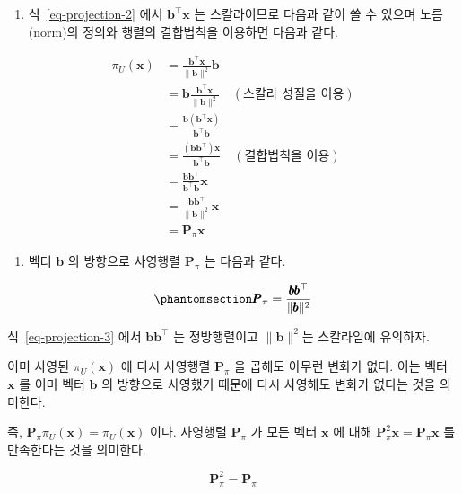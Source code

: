 \documentclass[
  11pt,
  a4paper,
  oneside]{scrbook}
\providecommand{\tightlist}{%
  \setlength{\itemsep}{0pt}\setlength{\parskip}{0pt}}\usepackage{longtable,booktabs,array}
\theoremstyle{definition}
\theoremstyle{definition}
\theoremstyle{plain}
\theoremstyle{remark}
\begin{document}
\begin{enumerate}
\def\labelenumi{\arabic{enumi}.}
\setcounter{enumi}{5}
\tightlist
\item
  식~\ref{eq-projection-2} 에서 \(\pmb{b}^{\top} \pmb{x}\) 는
  스칼라이므로 다음과 같이 쓸 수 있으며 노름(norm)의 정의와 행렬의
  결합법칙을 이용하면 다음과 같다.
\end{enumerate}

\[ 
\begin{aligned}
\pi_U(\pmb{x}) &= \frac{\pmb{b}^{\top} \pmb{x}}{\|\pmb{b}\|^2} \pmb{b} \\
& = \pmb{b} \frac{\pmb{b}^{\top} \pmb{x}}{\|\pmb{b}\|^2} \quad (\text{스칼라 성질을 이용})\\
& =\frac{\pmb{b} (\pmb{b}^{\top} \pmb{x})}{\pmb{b}^{\top} \pmb{b}} \\ 
& =\frac{(\pmb{b} \pmb{b}^{\top}) \pmb{x}}{\pmb{b}^{\top} \pmb{b}}  \quad (\text{결합법칙을 이용})\\
& =\frac{\pmb{b} \pmb{b}^{\top}}{\pmb{b}^{\top} \pmb{b}} \pmb{x} \\
& =\frac{\pmb{b} \pmb{b}^{\top}}{\|\pmb{b}\|^2} \pmb{x} \\
& =\pmb P_{\pi}\pmb{x}
\end{aligned}
\]

\begin{enumerate}
\def\labelenumi{\arabic{enumi}.}
\setcounter{enumi}{6}
\tightlist
\item
  벡터 \(\pmb b\) 의 방향으로 사영행렬 \(\pmb P_{\pi}\) 는 다음과 같다.
\end{enumerate}

\begin{equation}\phantomsection\label{eq-projection-3}{
\pmb P_{\pi} = \frac{\pmb{b} \pmb{b}^{\top}}{\|\pmb{b}\|^2} 
}\end{equation}

식~\ref{eq-projection-3} 에서 \(\pmb{b} \pmb{b}^{\top}\) 는 정방행렬이고
\(\|\pmb{b}\|^2\)는 스칼라임에 유의하자.

\begin{tcolorbox}[enhanced jigsaw, colback=white, colframe=quarto-callout-important-color-frame, opacityback=0, toprule=.15mm, leftrule=.75mm, titlerule=0mm, opacitybacktitle=0.6, title=\textcolor{quarto-callout-important-color}{\faExclamation}\hspace{0.5em}{사영행렬의 성질}, colbacktitle=quarto-callout-important-color!10!white, breakable, bottomrule=.15mm, bottomtitle=1mm, toptitle=1mm, arc=.35mm, left=2mm, rightrule=.15mm, coltitle=black]

이미 사영된 \(\pi_U(\boldsymbol{x})\) 에 다시 사영행렬
\(\boldsymbol{P}_\pi\) 을 곱해도 아무런 변화가 없다. 이는 벡터
\(\pmb x\) 를 이미 벡터 \(\pmb b\) 의 방향으로 사영했기 때문에 다시
사영해도 변화가 없다는 것을 의미한다.

즉, \(\boldsymbol{P}_\pi \pi_U(\boldsymbol{x})=\pi_U(\boldsymbol{x})\)
이다. 사영행렬 \(\boldsymbol{P}_\pi\) 가 모든 벡터 \(\boldsymbol{x}\) 에
대해
\(\boldsymbol{P}_\pi^2 \boldsymbol{x}=\boldsymbol{P}_\pi \boldsymbol{x}\)
를 만족한다는 것을 의미한다.

\[ \boldsymbol{P}_\pi^2 = \boldsymbol{P}_\pi \]

\end{tcolorbox}
\end{document}
